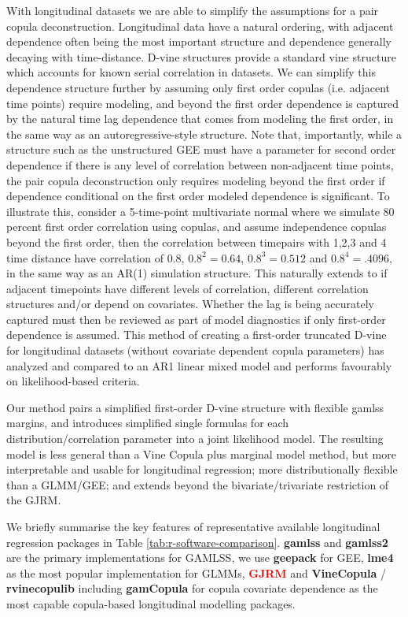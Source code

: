 \documentclass{article}
\newcommand{\pkg}{\textbf}
\newcommand{\jsschange}[1]{\textcolor{red}{#1}}
\begin{document}
With longitudinal datasets we are able to simplify the assumptions for a pair copula deconstruction. Longitudinal data have a natural ordering, with adjacent dependence often being the most important structure and dependence generally decaying with time-distance. D-vine structures\cite{smith_copula_2015} provide a standard vine structure which accounts for known serial correlation in datasets. We can simplify this dependence structure further by assuming only first order copulas (i.e. adjacent time points) require modeling, and beyond the first order dependence is captured by the natural time lag dependence that comes from modeling the first order, in the same way as an autoregressive-style structure. Note that, importantly, while a structure such as the unstructured GEE must have a parameter for second order dependence if there is any level of correlation between non-adjacent time points, the pair copula deconstruction only requires modeling beyond the first order if dependence conditional on the first order modeled dependence is significant. To illustrate this, consider a 5-time-point multivariate normal where we simulate 80 percent first order correlation using copulas, and assume independence copulas beyond the first order, then the correlation between timepairs with 1,2,3 and 4 time distance have correlation of $0.8$, $0.8^2=0.64$, $0.8^3=0.512$ and $0.8^4=.4096$, in the same way as an AR(1) simulation structure. This naturally extends to if adjacent timepoints have different levels of correlation, different correlation structures and/or depend on covariates. Whether the lag is being accurately captured must then be reviewed as part of model diagnostics if only first-order dependence is assumed. This method of creating a first-order truncated D-vine for longitudinal datasets (without covariate dependent copula parameters) has analyzed and compared to an AR1 linear mixed model and performs favourably on likelihood-based criteria\cite{killiches2018}.

Our method pairs a simplified first-order D-vine structure with flexible gamlss margins, and introduces simplified single formulas for each distribution/correlation parameter into a joint likelihood model. The resulting model is less general than a Vine Copula plus marginal model method, but more interpretable and usable for longitudinal regression; more distributionally flexible than a GLMM/GEE; and extends beyond the bivariate/trivariate restriction of the GJRM.

We briefly summarise the key features of representative available longitudinal regression packages in Table \ref{tab:r-software-comparison}. \pkg{gamlss} and \pkg{gamlss2} are the primary implementations for GAMLSS, we use \pkg{geepack} for GEE, \pkg{lme4} as the most popular implementation for GLMMs, \jsschange{\pkg{GJRM}} and \pkg{VineCopula} / \pkg{rvinecopulib} including \pkg{gamCopula} for copula covariate dependence as the most capable copula-based longitudinal modelling packages.
\end{document}
